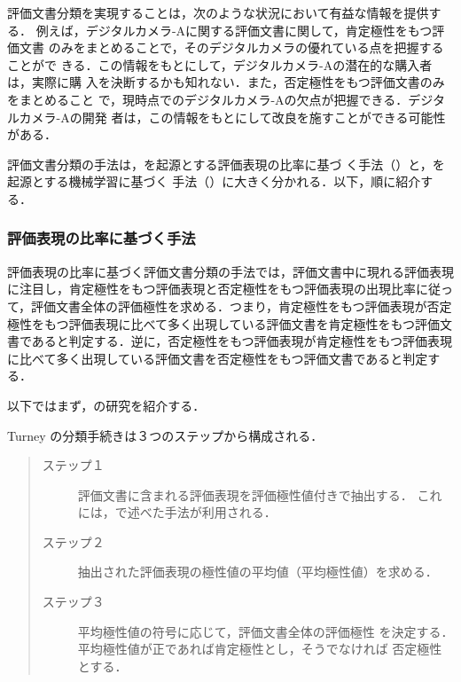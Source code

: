評価文書分類を実現することは，次のような状況において有益な情報を提供する．
例えば，デジタルカメラ-Aに関する評価文書に関して，肯定極性をもつ評価文書
のみをまとめることで，そのデジタルカメラの優れている点を把握することがで
きる．この情報をもとにして，デジタルカメラ-Aの潜在的な購入者は，実際に購
入を決断するかも知れない．また，否定極性をもつ評価文書のみをまとめること
で，現時点でのデジタルカメラ-Aの欠点が把握できる．デジタルカメラ-Aの開発
者は，この情報をもとにして改良を施すことができる可能性がある．

評価文書分類の手法は，\cite{turney2002a}を起源とする評価表現の比率に基づ
く手法（）と，\cite{pang2002a}を起源とする機械学習に基づく
手法（）に大きく分かれる．以下，順に紹介する．

\subsubsection{評価表現の比率に基づく手法}
\label{sec:dc_ratio}

評価表現の比率に基づく評価文書分類の手法では，評価文書中に現れる評価表現
に注目し，肯定極性をもつ評価表現と否定極性をもつ評価表現の出現比率に従っ
て，評価文書全体の評価極性を求める．つまり，肯定極性をもつ評価表現が否定
極性をもつ評価表現に比べて多く出現している評価文書を肯定極性をもつ評価文
書であると判定する．逆に，否定極性をもつ評価表現が肯定極性をもつ評価表現
に比べて多く出現している評価文書を否定極性をもつ評価文書であると判定する．

以下ではまず，\cite{turney2002a}の研究を紹介する．

\vspace{1em}
\underline{\textbf{\cite{turney2002a}}}
\vspace{1em}

Turney の分類手続きは３つのステップから構成される．

\vspace{1em}
\begin{quote}
\begin{description}
 \item[ステップ１] 評価文書に含まれる評価表現を評価極性値付きで抽出する．
これには，で述べた手法が利用される．
 \item[ステップ２] 抽出された評価表現の極性値の平均値（平均極性値）を求める．
 \item[ステップ３] 平均極性値の符号に応じて，評価文書全体の評価極性
を決定する．平均極性値が正であれば肯定極性とし，そうでなければ
否定極性とする．
\end{description}
\end{quote}
\vspace{1em}

